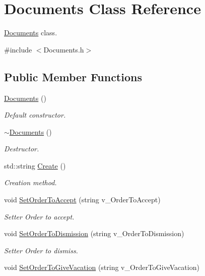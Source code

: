 \hypertarget{class_documents}{}\section{Documents Class Reference}
\label{class_documents}


\hyperlink{class_documents}{Documents} class.  




{\ttfamily \#include $<$Documents.\+h$>$}

\subsection*{Public Member Functions}
\begin{DoxyCompactItemize}
\item 
\hyperlink{class_documents_a52daba61782250a38f4964910a961793}{Documents} ()
\begin{DoxyCompactList}\small\item\em Default constructor. \end{DoxyCompactList}\item 
\hyperlink{class_documents_a67e92e6e30aeff0300ac69e55bd2aab0}{$\sim$\+Documents} ()
\begin{DoxyCompactList}\small\item\em Destructor. \end{DoxyCompactList}\item 
std\+::string \hyperlink{class_documents_a524740a8fbe3933562d63c9999c0cb53}{Create} ()
\begin{DoxyCompactList}\small\item\em Creation method. \end{DoxyCompactList}\item 
void \hyperlink{class_documents_aa101f46efd37c76443f90822407bcaa3}{Set\+Order\+To\+Accept} (string v\+\_\+\+Order\+To\+Accept)
\begin{DoxyCompactList}\small\item\em Setter Order to accept. \end{DoxyCompactList}\item 
void \hyperlink{class_documents_ae91e6dba2623a69fafd9b886093087d0}{Set\+Order\+To\+Dismission} (string v\+\_\+\+Order\+To\+Dismission)
\begin{DoxyCompactList}\small\item\em Setter Order to dismiss. \end{DoxyCompactList}\item 
void \hyperlink{class_documents_a484f3e195b0ab7383ef09278cd95907f}{Set\+Order\+To\+Give\+Vacation} (string v\+\_\+\+Order\+To\+Give\+Vacation)

\end{DoxyCompactItemize}
